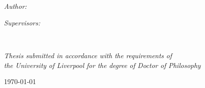 \documentclass[11pt, twoside, english, doublespacing, nolistspacing, headsepline]{MastersDoctoralThesis}
\author{Tabitha \textsc{Halewood-Leagas}} %
\begin{document}
\frontmatter %

\pagestyle{plain} %


\begin{titlepage}
\begin{center}

\vspace*{.06\textheight}
{\scshape\LARGE \univname\par}\vspace{1.5cm} %

\HRule \\[0.4cm] %
{\huge \bfseries \ttitle\par}\vspace{0.4cm} %
\HRule \\[1.5cm] %
 
\begin{minipage}[t]{0.4\textwidth}
\begin{flushleft} \large
\emph{Author:}\\
{\authorname} %
\end{flushleft}
\end{minipage}
\begin{minipage}[t]{0.4\textwidth}
\begin{flushright} \large
\emph{Supervisors:} \\
{\supname} %
\end{flushright}
\end{minipage}\\[3cm]
 
\vfill

\large \textit{Thesis submitted in accordance with the requirements of\\ the University of Liverpool for the degree of Doctor of Philosophy}\\[0.3cm] %
 
\vfill

{\large \today}\\[4cm] %
 
\vfill
\end{center}
\end{titlepage}
\end{document}
